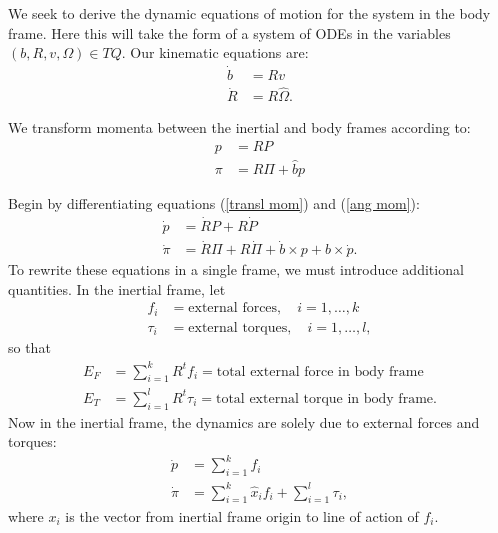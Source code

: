 \documentclass{aims}
\theoremstyle{definition}
\begin{document}
	
We seek to derive the dynamic equations of motion for the system in the body frame.  Here this will take the form of a system of ODEs in the variables $(b, R, v, \Omega) \in TQ$.  Our kinematic equations are:
\begin{align}
\dot{b} &= Rv \label{b dot} \\
\dot{R} &= R\hat{\Omega} \label{R dot}.
\end{align}

We transform momenta between the inertial and body frames according to:
\begin{align}
p&=RP \label{transl mom} \\
\pi &= R\Pi + \hat{b} p \label{ang mom}
\end{align}

Begin by differentiating equations (\ref{transl mom}) and (\ref{ang mom}):
\begin{align}
\dot{p} &= \dot{R}P + R\dot{P} \label{little p dot} \\ 
\dot{\pi} &= \dot{R}\Pi + R \dot{\Pi} + \dot{b} \times p + b \times \dot{p}. \label{little pi dot}
\end{align}
To rewrite these equations in a single frame, we must introduce additional quantities.  In the inertial frame, let 
\begin{align*}
f_i &= \text{external forces}, \quad  i=1, \dots, k  \\
\tau_i &= \text{external torques}, \quad  i=1, \dots, l, 
\end{align*}
so that 
\begin{align}
E_F &= \sum_{i=1}^k R^tf_i \label{ext forces}= \text{total external force in body frame} \\
E_T &= \sum_{i=1}^l R^t\tau_i \label{ext torques}= \text{total external torque in body frame}.
\end{align}
Now in the inertial frame, the dynamics are solely due to external forces and torques:
\begin{align}
\dot{p} &= \sum_{i=1}^k f_i \label{p dot}\\
\dot{\pi} &= \sum_{i=1}^k \hat{x}_i f_i + \sum_{i=1}^l \tau_i, \label{pi dot}
\end{align}
where $x_i$ is the vector from inertial frame origin to line of action of $f_i$.
 
\end{document}
